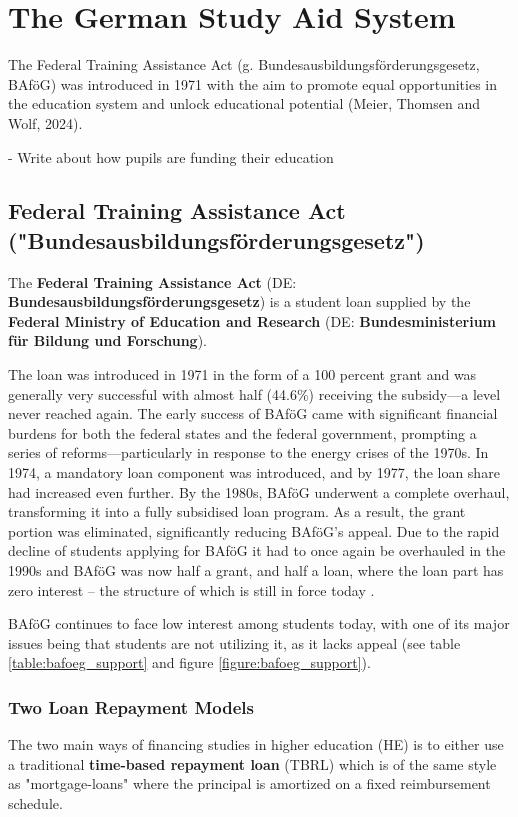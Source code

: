 \section{The German Study Aid System} 
\label{section:the-german-study-aid-system}

The Federal Training Assistance Act (g. Bundesausbildungsförderungsgesetz, BAföG) was introduced in 1971 with the aim to promote equal opportunities in the education system and unlock educational potential (Meier, Thomsen and Wolf, 2024).

- Write about how pupils are funding their education 



\subsection{Federal Training Assistance Act ("Bundesausbildungsförderungsgesetz") } 
\label{subsection:federal-training-assistance-act}
The \textbf{Federal Training Assistance Act} (DE: \textbf{Bundesausbildungsförderungsgesetz}) is a student loan supplied by the \textbf{Federal Ministry of Education and Research} (DE: \textbf{Bundesministerium für Bildung und Forschung}). 

The loan was introduced in 1971 in the form of a 100 percent grant and was generally very successful with almost half (44.6\%) receiving the subsidy---a level never reached again. 
The early success of BAföG came with significant financial burdens for both the federal states and the federal government, prompting a series of reforms—particularly in response to the energy crises of the 1970s. In 1974, a mandatory loan component was introduced, and by 1977, the loan share had increased even further. By the 1980s, BAföG underwent a complete overhaul, transforming it into a fully subsidised loan program. As a result, the grant portion was eliminated, significantly reducing BAföG's appeal.
Due to the rapid decline of students applying for BAföG it had to once again be overhauled in the 1990s and BAföG was now half a grant, and half a loan, where the loan part has zero interest -- the structure of which is still in force today \citep{lost_geschichte_2025}.

BAföG continues to face low interest among students today, with one of its major issues being that students are not utilizing it, as it lacks appeal (see table \ref{table:bafoeg_support} and figure \ref{figure:bafoeg_support}). 

\subsubsection{Two Loan Repayment Models}
\label{subsection:loan-repayment-plan}
The two main ways of financing studies in higher education (HE) is to either use a traditional 
\textbf{time-based repayment loan} (TBRL) which is of the same style as "mortgage-loans" 
where the principal is amortized on a fixed reimbursement schedule.

